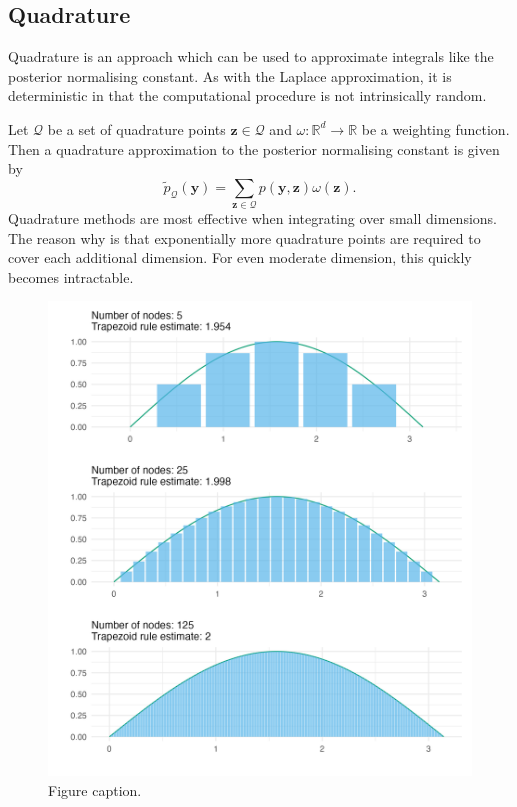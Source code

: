 \documentclass[a4paper, nobind]{templates/ociamthesis}
\begin{document}
\hypertarget{quadrature}{%
\subsection{Quadrature}\label{quadrature}}

Quadrature is an approach which can be used to approximate integrals like the posterior normalising constant.
As with the Laplace approximation, it is deterministic in that the computational procedure is not intrinsically random.

Let \(\mathcal{Q}\) be a set of quadrature points \(\mathbf{z} \in \mathcal{Q}\) and \(\omega: \mathbb{R}^d \to \mathbb{R}\) be a weighting function.
Then a quadrature approximation to the posterior normalising constant is given by
\begin{equation}
\tilde p_{\mathcal{Q}}(\mathbf{y}) = \sum_{\mathbf{z} \in \mathcal{Q}} p(\mathbf{y}, \mathbf{z}) \omega(\mathbf{z}).
\end{equation}
Quadrature methods are most effective when integrating over small dimensions.
The reason why is that exponentially more quadrature points are required to cover each additional dimension.
For even moderate dimension, this quickly becomes intractable.



\begin{figure}

{\centering \includegraphics[width=0.95\linewidth]{figures/naomi-aghq/trapezoid} 

}

\caption{Figure caption.}\label{fig:trapezoid}
\end{figure}
\end{document}
